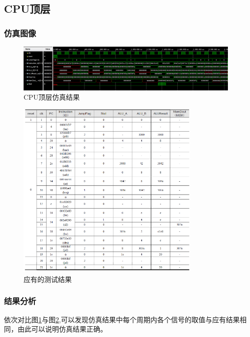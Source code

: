 \documentclass{../source/zjureport}
\begin{document}
        \subsection{CPU顶层}
            \subsubsection{仿真图像}
            \begin{figure}[H]
                \centering
                \includegraphics[width = 0.98\textwidth]{figure/顶层.png}
                \caption{CPU顶层仿真结果}
                \label{测试结果}
            \end{figure}

            \begin{figure}[H]
                \centering
                \includegraphics[width = 0.8\textwidth]{figure/测试结果.png}
                \caption{应有的测试结果}
                \label{应有结果}
            \end{figure}

            \subsubsection{结果分析}
            依次对比图\ref{测试结果}与图\ref{应有结果},可以发现仿真结果中每个周期内各个信号的取值与应有结果相同，由此可以说明仿真结果正确。
\end{document}
